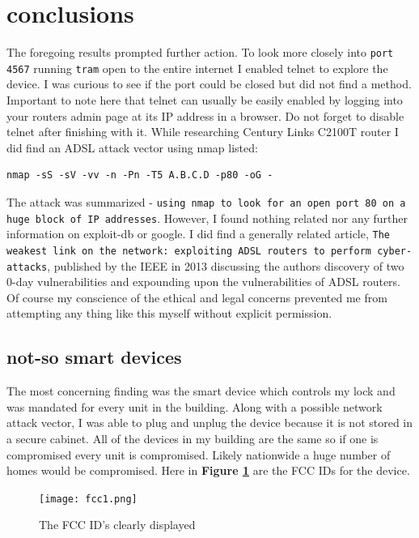 \documentclass[10pt]{article}
\begin{document}
\section*{conclusions}
The foregoing results prompted further action. To look more closely into \verb|port 4567| running \verb|tram| open to the entire internet I enabled telnet to
explore the device. I was curious to see if the port could be closed but did not find a method. Important to note here that telnet can usually be easily enabled by 
logging into your routers admin page at its IP address in a browser. Do not forget to disable telnet after finishing with it. While researching Century Links C2100T router 
I did find an ADSL attack vector using nmap listed:\cite{techni}
\begin{verbatim}
nmap -sS -sV -vv -n -Pn -T5 A.B.C.D -p80 -oG -
\end{verbatim}
The attack was summarized - \verb|using nmap to look for an open port 80 on a huge block of IP addresses|.\cite{techni}
However, I found nothing related nor any further information on exploit-db or google. I did find a generally related 
article, \verb|The weakest link on the network: exploiting ADSL routers to perform cyber-attacks|, published by the IEEE 
in 2013 discussing the authors discovery of two 0-day vulnerabilities and expounding upon the vulnerabilities of ADSL routers.\cite{journal} Of course my conscience of the ethical 
and legal concerns prevented me from attempting any thing like this myself without explicit permission.

\subsection*{not-so smart devices}
The most concerning finding was the smart device which controls my lock and was mandated for every unit in the building. Along with a possible network attack vector, 
I was able to plug and unplug the device because it is not stored in a secure cabinet. All of the devices in my building are the same so if one is compromised 
every unit is compromised. Likely nationwide a huge number of homes would be compromised. Here in \textbf{Figure \ref{fcc1 image}} are the FCC IDs for the device.
\begin{figure}[H]
\centering
\texttt{[image: fcc1.png]}
\caption{The FCC ID's clearly displayed}\label{fcc1 image}
\end{figure}
\end{document}
